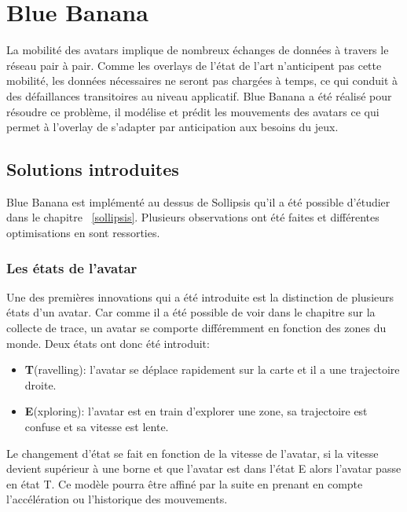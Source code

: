 \section{Blue Banana}
	\label{BlueBanana}
	La mobilité des avatars implique de nombreux échanges de données à travers le réseau pair à pair. Comme les overlays de l'état de l'art n'anticipent pas cette mobilité, les données nécessaires ne seront pas chargées à temps, ce qui conduit à des défaillances transitoires au niveau applicatif. Blue Banana a été réalisé pour résoudre ce problème, il modélise et prédit les mouvements des avatars ce qui permet à l'overlay de s'adapter par anticipation aux besoins du jeux.
	\subsection{Solutions introduites}
	Blue Banana est implémenté au dessus de Sollipsis qu'il a été possible d'étudier dans le chapitre ~\ref{sollipsis}. Plusieurs observations ont été faites et différentes optimisations en sont ressorties.
	\subsubsection{Les états de l'avatar}
	Une des premières innovations qui a été introduite est la distinction de plusieurs états d'un avatar. Car comme il a été possible de voir dans le chapitre sur la collecte de trace, un avatar se comporte différemment en fonction des zones du monde. Deux états ont donc été introduit:
	\begin{itemize}
	\renewcommand{\labelitemi}{$\bullet$}
		\item \textbf{T}(ravelling): l'avatar se déplace rapidement sur la carte et il a une trajectoire droite.  
		\item \textbf{E}(xploring): l'avatar est en train d'explorer une zone, sa trajectoire est confuse et sa vitesse est lente.
	\end{itemize} 
	Le changement d'état se fait en fonction de la vitesse de l'avatar, si la vitesse devient supérieur à une borne et que l'avatar est dans l'état E alors l'avatar passe en état T. Ce modèle pourra être affiné par la suite en prenant en compte l'accélération ou l'historique des mouvements. \\
